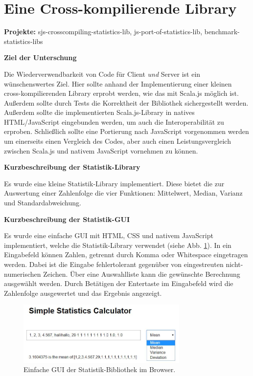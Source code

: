 \documentclass[a4paper, 12pt, hidelinks, listof=totoc, listoftables=totoc, bibliography=totoc]{scrreprt}
\newcommand{\MyMiniSec}[1]{\rmfamily\fontsize{12}{15}\selectfont
	\vspace{7pt}\textbf{#1} %
}
\begin{document}
\section{Eine Cross-kompilierende Library}

\textbf{Projekte:} sjs-crosscompiling-statistics-lib, js-port-of-statistics-lib, benchmark-statistics-libs

\MyMiniSec{Ziel der Unterschung}

Die Wiederverwendbarkeit von Code für Client \emph{und} Server ist ein wünschenswertes Ziel. Hier sollte anhand der Implementierung einer kleinen cross-kompilierenden Library erprobt werden, wie das mit Scala.js möglich ist. Außerdem sollte durch Tests die Korrektheit der Bibliothek sichergestellt werden. Außerdem sollte die implementierten Scala.js-Library in natives HTML/JavaScript eingebunden werden, um auch die Interoperabilität zu erproben. Schließlich sollte eine Portierung nach JavaScript vorgenommen werden um einerseits einen Vergleich des Codes, aber auch einen Leistungsvergleich zwischen Scala.js und nativem JavaScript vornehmen zu können.


\MyMiniSec{Kurzbeschreibung der Statistik-Library}

Es wurde eine kleine Statistik-Library implementiert. Diese bietet die zur Auswertung einer Zahlenfolge die 
vier Funktionen: Mittelwert, Median, Varianz und Standardabweichung.

\MyMiniSec{Kurzbeschreibung der Statistik-GUI}

Es wurde eine einfache GUI mit \ac{HTML}, \ac{CSS} und nativem JavaScript implementiert, welche die Statistik-Library verwendet (siehe Abb. \ref{fig:stat-lib-gui}). In ein Eingabefeld können Zahlen, getrennt durch Komma oder Whitespace eingetragen werden. Dabei ist die Eingabe fehlertolerant gegenüber von eingestreuten nicht-numerischen Zeichen. Über eine Auswahlliste kann die gewünschte Berechnung ausgewählt werden. Durch Betätigen der Entertaste im Eingabefeld wird die Zahlenfolge ausgewertet und das Ergebnis angezeigt.

\begin{figure}[!h]
    \centering
    \includegraphics[width=0.75\textwidth, frame]{statistics-lib/statistics-gui}
    \caption{Einfache GUI der Statistik-Bibliothek im Browser.}
    \label{fig:stat-lib-gui}
\end{figure}
\end{document}
